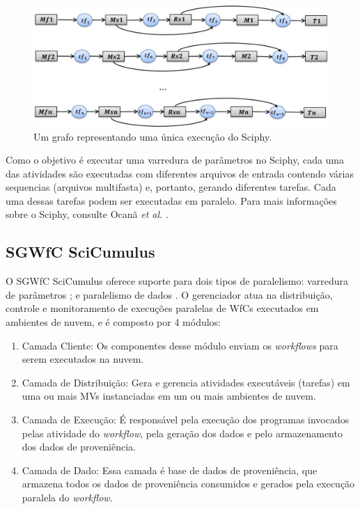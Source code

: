 \begin{figure}[!ht]
\centering
\includegraphics[width=0.8\linewidth]{figure/sciphy.jpg}
\caption{Um grafo representando uma única execução do Sciphy.}
\label{fig:sciphy}
\end{figure}

Como o objetivo é executar uma varredura de parâmetros no Sciphy, cada uma das atividades são executadas com diferentes arquivos de entrada contendo várias sequencias (arquivos multifasta) e, portanto, gerando diferentes tarefas. Cada uma dessas tarefas podem ser executadas em paralelo. Para mais informações sobre o Sciphy, consulte Ocanã \textit{et al.} \cite{ocana2011}.


\subsection{SGWfC SciCumulus}

O SGWfC SciCumulus oferece suporte para dois tipos de paralelismo: varredura de parâmetros \cite{Walker2007}; e paralelismo de dados \cite{Coutinho2010}. O gerenciador atua na distribuição, controle e monitoramento de execuções paralelas de WfCs executados em ambientes de nuvem, e é composto por 4 módulos:

\begin{enumerate}[I]
\item Camada Cliente: Os componentes desse módulo enviam os \textit{workflows} para serem executados na nuvem.
\item Camada de Distribuição: Gera e gerencia  atividades executáveis (tarefas) em uma ou mais MVs instanciadas em um ou mais ambientes de nuvem. 
\item Camada de Execução: É responsável pela execução dos programas invocados pelas atividade do \textit{workflow}, pela geração dos dados e pelo armazenamento dos dados de proveniência.
\item Camada de Dado: Essa camada é base de dados de proveniência, que armazena todos os dados de proveniência consumidos e gerados pela execução paralela do \textit{workflow}. 
\end{enumerate}

